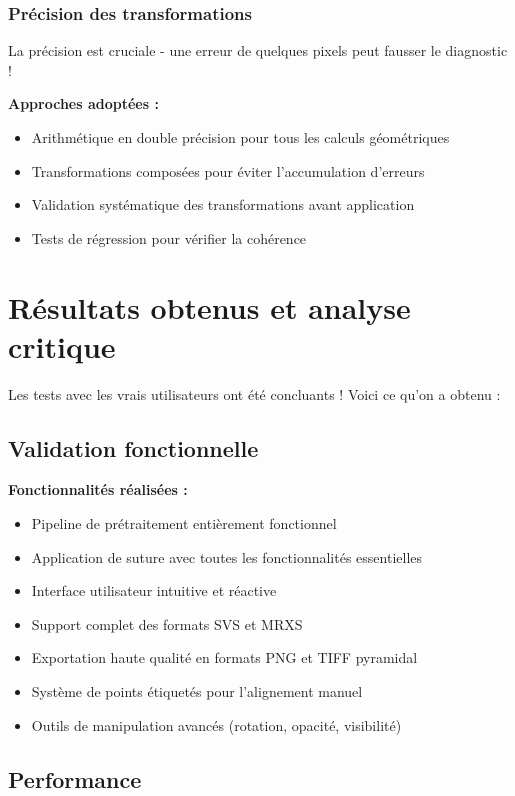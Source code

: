 \documentclass[11pt,a4paper]{report}
\begin{document}
\subsubsection{Précision des transformations}

La précision est cruciale - une erreur de quelques pixels peut fausser le diagnostic !

\textbf{Approches adoptées :}
\begin{itemize}
\item Arithmétique en double précision pour tous les calculs géométriques
\item Transformations composées pour éviter l'accumulation d'erreurs
\item Validation systématique des transformations avant application
\item Tests de régression pour vérifier la cohérence
\end{itemize}

\section{Résultats obtenus et analyse critique}

Les tests avec les vrais utilisateurs ont été concluants ! Voici ce qu'on a obtenu :

\subsection{Validation fonctionnelle}

\textbf{Fonctionnalités réalisées :}
\begin{itemize}
\item Pipeline de prétraitement entièrement fonctionnel
\item Application de suture avec toutes les fonctionnalités essentielles
\item Interface utilisateur intuitive et réactive
\item Support complet des formats SVS et MRXS
\item Exportation haute qualité en formats PNG et TIFF pyramidal
\item Système de points étiquetés pour l'alignement manuel
\item Outils de manipulation avancés (rotation, opacité, visibilité)
\end{itemize}

\subsection{Performance}
\end{document}
